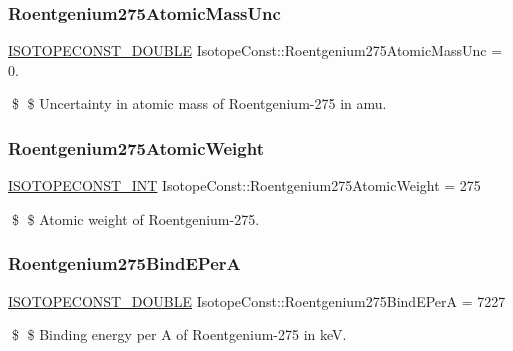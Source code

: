 \subsubsection{\texorpdfstring{Roentgenium275\+Atomic\+Mass\+Unc}{Roentgenium275AtomicMassUnc}}
{\footnotesize\ttfamily \mbox{\hyperlink{group___isotope_const-_macros_ga8f45a7272ce02c0b4c65c44636ed719a}{I\+S\+O\+T\+O\+P\+E\+C\+O\+N\+S\+T\+\_\+\+D\+O\+U\+B\+LE}} Isotope\+Const\+::\+Roentgenium275\+Atomic\+Mass\+Unc = 0.}

\$ \$ Uncertainty in atomic mass of Roentgenium-\/275 in amu. \mbox{\label{group___isotope_const-_roentgenium-_rg275_ga39cca6116076b99f08b5aafb64375967}} 
\subsubsection{\texorpdfstring{Roentgenium275\+Atomic\+Weight}{Roentgenium275AtomicWeight}}
{\footnotesize\ttfamily \mbox{\hyperlink{group___isotope_const-_macros_ga5f18360b3e99483a35c32d789e62621c}{I\+S\+O\+T\+O\+P\+E\+C\+O\+N\+S\+T\+\_\+\+I\+NT}} Isotope\+Const\+::\+Roentgenium275\+Atomic\+Weight = 275}

\$ \$ Atomic weight of Roentgenium-\/275. \mbox{\label{group___isotope_const-_roentgenium-_rg275_ga17791f9bbd6ef1076ae6e89c8e3ae910}} 
\subsubsection{\texorpdfstring{Roentgenium275\+Bind\+E\+PerA}{Roentgenium275BindEPerA}}
{\footnotesize\ttfamily \mbox{\hyperlink{group___isotope_const-_macros_ga8f45a7272ce02c0b4c65c44636ed719a}{I\+S\+O\+T\+O\+P\+E\+C\+O\+N\+S\+T\+\_\+\+D\+O\+U\+B\+LE}} Isotope\+Const\+::\+Roentgenium275\+Bind\+E\+PerA = 7227}

\$ \$ Binding energy per A of Roentgenium-\/275 in keV. \mbox{\label{group___isotope_const-_roentgenium-_rg275_gad7e89159c6d63e52a0cea6fc2e6fd96b}} 
